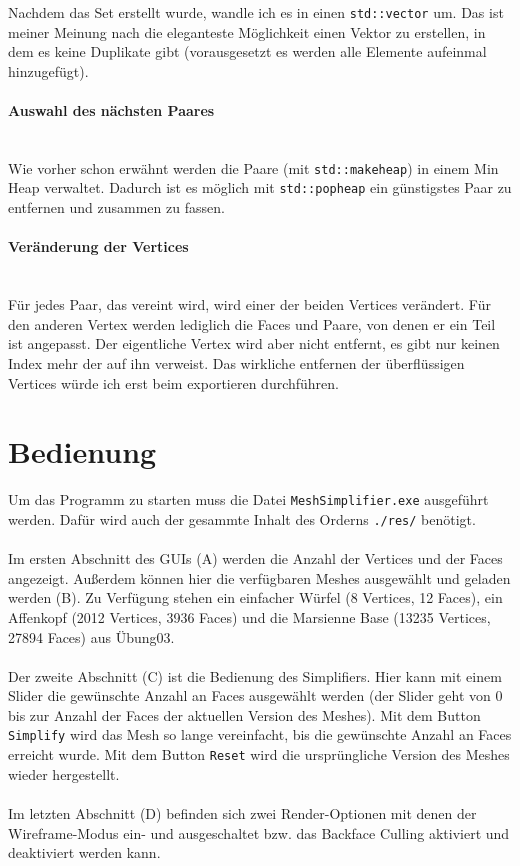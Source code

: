 \documentclass[a4paper,12pt]{article}
\newcommand{\myparagraph}[1]{\paragraph*{#1}\mbox{}\\}
\begin{document}
Nachdem das Set erstellt wurde, wandle ich es in einen \texttt{std::vector} um.
Das ist meiner Meinung nach die eleganteste Möglichkeit einen Vektor zu erstellen, in dem es keine Duplikate gibt (vorausgesetzt es werden alle Elemente aufeinmal hinzugefügt).

\myparagraph{Auswahl des nächsten Paares}
Wie vorher schon erwähnt werden die Paare (mit \texttt{std::make\textunderscore heap}) in einem Min Heap verwaltet. 
Dadurch ist es möglich mit \texttt{std::pop\textunderscore heap} ein günstigstes Paar zu entfernen und zusammen zu fassen. 

\myparagraph{Veränderung der Vertices}
Für jedes Paar, das vereint wird, wird einer der beiden Vertices verändert.
Für den anderen Vertex werden lediglich die Faces und Paare, von denen er ein Teil ist angepasst.
Der eigentliche Vertex wird aber nicht entfernt, es gibt nur keinen Index mehr der auf ihn verweist.
Das wirkliche entfernen der überflüssigen Vertices würde ich erst beim exportieren durchführen.

\newpage
\section*{Bedienung}

Um das Programm zu starten muss die Datei \texttt{MeshSimplifier.exe} ausgeführt werden. Dafür wird auch der gesammte Inhalt des Orderns \texttt{./res/} benötigt.
\\
\\
Im ersten Abschnitt des GUIs (A) werden die Anzahl der Vertices und der Faces angezeigt. 
Außerdem können hier die verfügbaren Meshes ausgewählt und geladen werden (B). Zu Verfügung stehen ein einfacher Würfel (8 Vertices, 12 Faces), ein Affenkopf (2012 Vertices, 3936 Faces) und die Marsienne Base (13235 Vertices, 27894 Faces) aus Übung03.
\\
\\
Der zweite Abschnitt (C) ist die Bedienung des Simplifiers. Hier kann mit einem Slider die gewünschte Anzahl an Faces ausgewählt werden (der Slider geht von 0 bis zur Anzahl der Faces der aktuellen Version des Meshes). Mit dem Button \texttt{Simplify} wird das Mesh so lange vereinfacht, bis die gewünschte Anzahl an Faces erreicht wurde. Mit dem Button \texttt{Reset} wird die ursprüngliche Version des Meshes wieder hergestellt.
\\
\\
Im letzten Abschnitt (D) befinden sich zwei Render-Optionen mit denen der Wireframe-Modus ein- und ausgeschaltet bzw. das Backface Culling aktiviert und deaktiviert werden kann.
\end{document}
